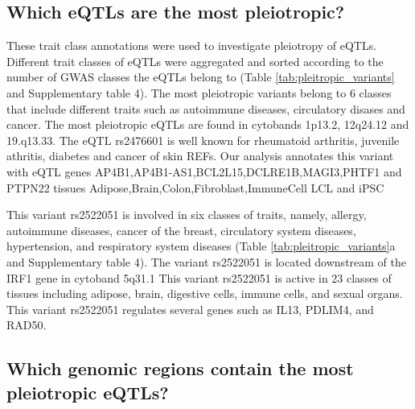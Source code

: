 %
\subsection*{Which eQTLs are the most pleiotropic?}
%

These trait class annotations were used to investigate pleiotropy of eQTLs.
%
Different trait classes of eQTLs were aggregated and sorted according to the number of GWAS classes the eQTLs belong to (Table \ref{tab:pleitropic_variants} and Supplementary table 4).
%
The most pleiotropic variants belong to 6 classes that include different traits such as autoimmune diseases, circulatory disases and cancer.
%
The most pleiotropic eQTLs are found in cytobands 1p13.2, 12q24.12 and 19.q13.33.
%
The eQTL rs2476601 is well known for rheumatoid arthritis, juvenile athritis, diabetes and cancer of skin REFs.
%
Our analysis annotates this variant with eQTL genes AP4B1,AP4B1-AS1,BCL2L15,DCLRE1B,MAGI3,PHTF1 and PTPN22 tissues Adipose,Brain,Colon,Fibroblast,ImmuneCell LCL and iPSC

This variant rs2522051 is involved in six classes of traits, namely,
allergy, autoimmune diseases, cancer of the breast, circulatory system diseases, hypertension, and respiratory system diseases
(Table \ref{tab:pleitropic_variants}a and Supplementary table 4).
%
The variant rs2522051 is located downstream of the IRF1 gene in cytoband 5q31.1
%
This variant rs2522051 is active in 23 classes of tissues including adipose, brain, digestive cells, immune cells, and sexual organs.
%
This variant rs2522051 regulates several genes such as IL13, PDLIM4, and RAD50.

%
\subsection*{Which genomic regions contain the most pleiotropic eQTLs?}
%

